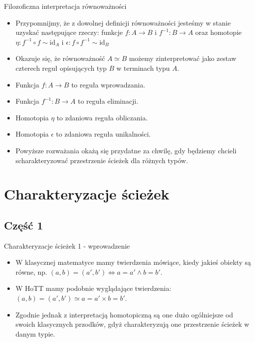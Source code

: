 \documentclass{beamer}
\newcommand{\id}{\text{id}}
\newcommand{\comp}{\circ}
\newcommand{\finv}[1]{#1^{-1}}
\newcommand{\inv}[1]{#1^{-1}}
\begin{document}
\begin{frame}{Filozoficzna interpretacja równoważności}
\begin{itemize}
	\item Przypomnijmy, że z dowolnej definicji równoważności jesteśmy w stanie uzyskać następujące rzeczy: funkcje $f : A \to B$ i $\inv{f} : B \to A$ oraz homotopie $\eta : \inv{f} \comp f \sim \id_A$ i $\epsilon : f \comp \inv{f} \sim \id_B$
	\item Okazuje się, że równoważność $A \simeq B$ możemy zinterpretować jako zestaw czterech reguł opisujących typ $B$ w terminach typu $A$.
	\item Funkcja $f : A \to B$ to reguła wprowadzania.
	\item Funkcja $\finv{f} : B \to A$ to reguła eliminacji.
	\item Homotopia $\eta$ to zdaniowa reguła obliczania.
	\item Homotopia $\epsilon$ to zdaniowa reguła unikalności.
	\item Powyższe rozważania okażą się przydatne za chwilę, gdy będziemy chcieli scharakteryzować przestrzenie ścieżek dla różnych typów.
\end{itemize}
\end{frame}

\section{Charakteryzacje ścieżek}

\subsection{Część 1}

\begin{frame}{Charakteryzacje ścieżek 1 - wprowadzenie}
\begin{itemize}
	\item W klasycznej matematyce mamy twierdzenia mówiące, kiedy jakieś obiekty są równe, np. $(a, b) = (a', b') \iff a = a' \land b = b'$.
	\item W HoTT mamy podobnie wyglądające twierdzenia: $(a, b) = (a', b') \simeq a = a' \times b = b'$.
	\item Zgodnie jednak z interpretacją homotopiczną są one dużo ogólniejsze od swoich klasycznych przodków, gdyż charakteryzują one przestrzenie ścieżek w danym typie.
\end{itemize}
\end{frame}
\end{document}

